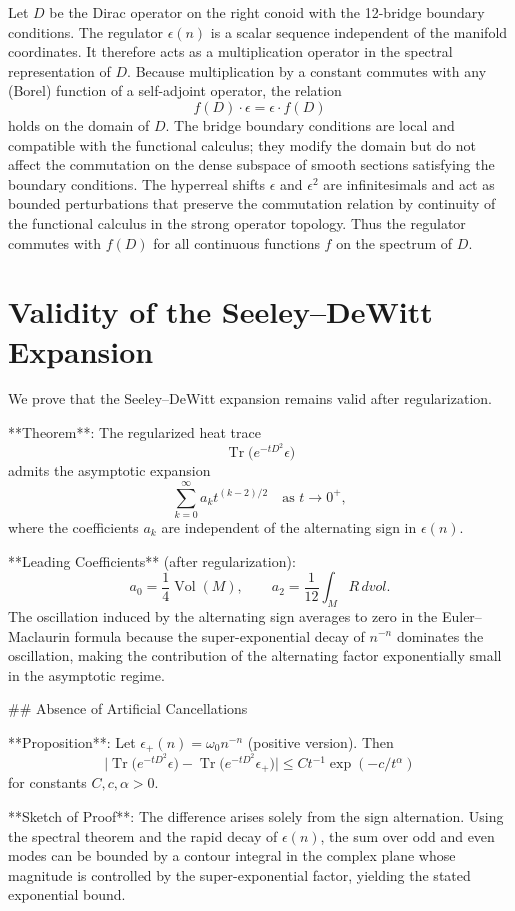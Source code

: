 \documentclass[11pt,a4paper]{article}
\begin{document}
Let \(D\) be the Dirac operator on the right conoid with the 12-bridge boundary conditions. The regulator \(\epsilon(n)\) is a scalar sequence independent of the manifold coordinates. It therefore acts as a multiplication operator in the spectral representation of \(D\). Because multiplication by a constant commutes with any (Borel) function of a self-adjoint operator, the relation
\[
f(D) \cdot \epsilon = \epsilon \cdot f(D)
\]
holds on the domain of \(D\). The bridge boundary conditions are local and compatible with the functional calculus; they modify the domain but do not affect the commutation on the dense subspace of smooth sections satisfying the boundary conditions. The hyperreal shifts \(\epsilon\) and \(\epsilon^2\) are infinitesimals and act as bounded perturbations that preserve the commutation relation by continuity of the functional calculus in the strong operator topology. Thus the regulator commutes with \(f(D)\) for all continuous functions \(f\) on the spectrum of \(D\).

\section{Validity of the Seeley–DeWitt Expansion}

We prove that the Seeley–DeWitt expansion remains valid after regularization.

**Theorem**: The regularized heat trace
\[
\operatorname{Tr} \bigl( e^{-t D^2} \epsilon \bigr)
\]
admits the asymptotic expansion
\[
\sum_{k=0}^\infty a_k t^{(k-2)/2} \quad \text{as } t \to 0^+,
\]
where the coefficients \(a_k\) are independent of the alternating sign in \(\epsilon(n)\).

**Leading Coefficients** (after regularization):
\[
a_0 = \frac{1}{4} \operatorname{Vol}(M), \qquad a_2 = \frac{1}{12} \int_M R \, dvol.
\]
The oscillation induced by the alternating sign averages to zero in the Euler–Maclaurin formula because the super-exponential decay of \(n^{-n}\) dominates the oscillation, making the contribution of the alternating factor exponentially small in the asymptotic regime.

## Absence of Artificial Cancellations

**Proposition**: Let \(\epsilon_+(n) = \omega_0 n^{-n}\) (positive version). Then
\[
\bigl| \operatorname{Tr} \bigl( e^{-t D^2} \epsilon \bigr) - \operatorname{Tr} \bigl( e^{-t D^2} \epsilon_+ \bigr) \bigr| \leq C t^{-1} \exp(-c / t^\alpha)
\]
for constants \(C, c, \alpha > 0\).

**Sketch of Proof**: The difference arises solely from the sign alternation. Using the spectral theorem and the rapid decay of \(\epsilon(n)\), the sum over odd and even modes can be bounded by a contour integral in the complex plane whose magnitude is controlled by the super-exponential factor, yielding the stated exponential bound.
\end{document}
